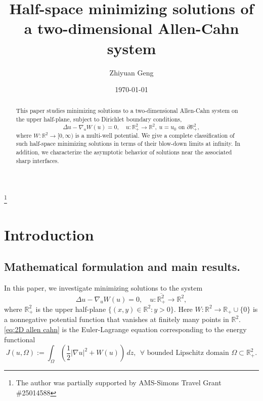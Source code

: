 \documentclass[leqno,11pt]{amsart}
\let\pa=\partial
\let\f=\frac
\let\Om=\Omega
\let\pa=\partial
\let\na=\nabla
\theoremstyle{remark}
\newcommand{\BR}{\mathbb{R}}
\begin{document}
\title[Half-space Allen-Cahn solution]{Half-space minimizing solutions of a two-dimensional Allen-Cahn system}

\author{Zhiyuan Geng}
\address{Department of Mathematical Sciences, University of Arkansas, 850 West Dickson Street, Fayetteville, AR 72701}
\thanks{The author was partially supported by AMS-Simons Travel Grant \#25014588}

\date{\today}

\begin{abstract}
This paper studies minimizing solutions to a two-dimensional Allen-Cahn system on the upper half-plane, subject to Dirichlet boundary conditions,
\begin{equation*}
    \Delta u-\nabla_u W(u)=0, \quad u: \mathbb{R}_+^2\to \mathbb{R}^2,\  u=u_0 \text{ on } \pa \mathbb{R}_+^2,
\end{equation*}
where $W: \mathbb{R}^2\to [0,\infty)$ is a multi-well potential. We give a complete classification of such half-space minimizing solutions in terms of their blow-down limits at infinity. In addition, we characterize the asymptotic behavior of solutions near the associated sharp interfaces.

\end{abstract}



\maketitle


\section{Introduction}\label{sec:intro}

\subsection{Mathematical formulation and main results.} In this paper, we investigate minimizing solutions to the system
\begin{equation}\label{eq:2D allen cahn}
    \Delta u-\nabla_u W (u)=0,\quad u:\overline{\mathbb{R}^2_+} \to \mathbb{R}^2,
\end{equation}
where $\mathbb{R}^2_+$ is the upper half-plane $\{(x,y)\in \mathbb{R}^2: y>0\}$. Here $W:\mathbb{R}^2\to \mathbb{R}_+\cup\{0\}$ is a nonnegative potential function that vanishes at finitely many points in $\BR^2$. \eqref{eq:2D allen cahn} is the Euler-Lagrange equation corresponding to the energy functional
\begin{equation}\label{energy functional}
J(u,\Omega):=\int_\Om \left( \f12|\na u|^2+W(u) \right)\,dz,\ \ \forall \text{ bounded Lipschitz domain } \Om\subset \BR^2_+. 
\end{equation}
\end{document}
